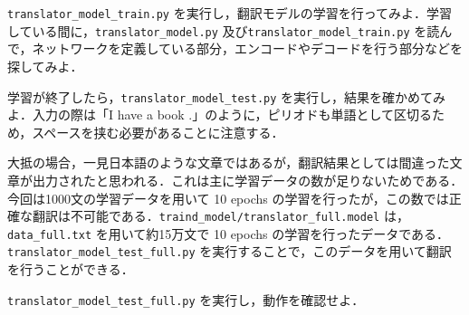  \begin{practice}
  \verb+translator_model_train.py+ を実行し，翻訳モデルの学習を行ってみよ．学習している間に，\verb+translator_model.py+ 及び\verb+translator_model_train.py+ を読んで，ネットワークを定義している部分，エンコードやデコードを行う部分などを探してみよ．
 \end{practice}
 \begin{practice}
  学習が終了したら，\verb+translator_model_test.py+ を実行し，結果を確かめてみよ．入力の際は「I have a book .」のように，ピリオドも単語として区切るため，スペースを挟む必要があることに注意する．
 \end{practice}

大抵の場合，一見日本語のような文章ではあるが，翻訳結果としては間違った文章が出力されたと思われる．これは主に学習データの数が足りないためである．今回は1000文の学習データを用いて 10 epochs の学習を行ったが，この数では正確な翻訳は不可能である．\verb+traind_model/translator_full.model+ は，\verb+data_full.txt+ を用いて約15万文で 10 epochs の学習を行ったデータである．\verb+translator_model_test_full.py+ を実行することで，このデータを用いて翻訳を行うことができる．
 \begin{practice}
  \verb+translator_model_test_full.py+ を実行し，動作を確認せよ．
 \end{practice}

